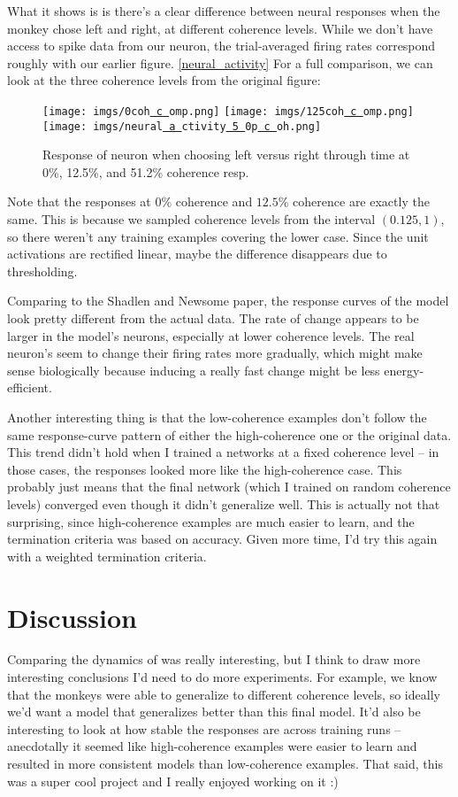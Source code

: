 \documentclass[11pt]{article}
\renewcommand{\_}[1]{\underline{ #1 }}
\theoremstyle{definition}
\begin{document}
What it shows is is there's a clear difference between neural responses when the monkey chose left and right, at different coherence levels. While we don't have access to spike data from our neuron, the trial-averaged firing rates correspond roughly with our earlier figure. \ref{neural_activity} For a full comparison, we can look at the three coherence levels from the original figure:

\begin{figure}[H]
  \centering
  \texttt{[image: imgs/0coh\_comp.png]}
  \texttt{[image: imgs/125coh\_comp.png]}
  \texttt{[image: imgs/neural\_activity\_50p\_coh.png]}
  \caption{Response of neuron when choosing left versus right through time at 0\%, 12.5\%, and 51.2\% coherence resp.}
\end{figure}

Note that the responses at $0\%$ coherence and $12.5\%$ coherence are exactly the same. This is because we sampled coherence levels from the interval $(0.125, 1)$, so there weren't any training examples covering the lower case. Since the unit activations are rectified linear, maybe the difference disappears due to thresholding.

Comparing to the Shadlen and Newsome paper, the response curves of the model look pretty different from the actual data. The rate of change appears to be larger in the model's neurons, especially at lower coherence levels. The real neuron's seem to change their firing rates more gradually, which might make sense biologically because inducing a really fast change might be less energy-efficient.

Another interesting thing is that the low-coherence examples don't follow the same response-curve pattern of either the high-coherence one or the original data. This trend didn't hold when I trained a networks at a fixed coherence level -- in those cases, the responses looked more like the high-coherence case. This probably just means that the final network (which I trained on random coherence levels) converged even though it didn't generalize well. This is actually not that surprising, since high-coherence examples are much easier to learn, and the termination criteria was based on accuracy. Given more time, I'd try this again with a weighted termination criteria.

\section{Discussion}

Comparing the dynamics of was really interesting, but I think to draw more interesting conclusions I'd need to do more experiments. For example, we know that the monkeys were able to generalize to different coherence levels, so ideally we'd want a model that generalizes better than this final model. It'd also be interesting to look at how stable the responses are across training runs -- anecdotally it seemed like high-coherence examples were easier to learn and resulted in more consistent models than low-coherence examples. That said, this was a super cool project and I really enjoyed working on it :)
\end{document}
